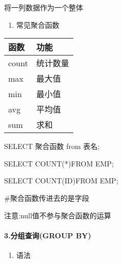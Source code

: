 \documentclass[
  letterpaper,
  DIV=11,
  numbers=noendperiod]{scrreprt}
\let\oldparagraph\paragraph
\renewcommand{\paragraph}[1]{\oldparagraph{#1}\mbox{}}
\newenvironment{Shaded}{\begin{snugshade}}{\end{snugshade}}
\newcommand{\FunctionTok}[1]{\textcolor[rgb]{0.28,0.35,0.67}{#1}}
\newcommand{\KeywordTok}[1]{\textcolor[rgb]{0.00,0.23,0.31}{#1}}
\newcommand{\NormalTok}[1]{\textcolor[rgb]{0.00,0.23,0.31}{#1}}
\newcommand{\OperatorTok}[1]{\textcolor[rgb]{0.37,0.37,0.37}{#1}}
\providecommand{\tightlist}{%
  \setlength{\itemsep}{0pt}\setlength{\parskip}{0pt}}\usepackage{longtable,booktabs,array}
\begin{document}
将一列数据作为一个整体

\begin{enumerate}
\def\labelenumi{\arabic{enumi}.}
\setcounter{enumi}{1}
\tightlist
\item
  常见聚合函数
\end{enumerate}

\begin{longtable}[]{@{}ll@{}}
\toprule\noalign{}
\textbf{函数} & \textbf{功能} \\
\midrule\noalign{}
\endhead
\bottomrule\noalign{}
\endlastfoot
count & 统计数量 \\
max & 最大值 \\
min & 最小值 \\
avg & 平均值 \\
sum & 求和 \\
\end{longtable}

\begin{Shaded}
\begin{Highlighting}[]
\KeywordTok{SELECT}\NormalTok{ 聚合函数 }\KeywordTok{from}\NormalTok{ 表名;}

\KeywordTok{SELECT} \FunctionTok{COUNT}\NormalTok{(}\OperatorTok{*}\NormalTok{)}\KeywordTok{FROM}\NormalTok{ EMP;}

\KeywordTok{SELECT} \FunctionTok{COUNT}\NormalTok{(}\KeywordTok{ID}\NormalTok{)}\KeywordTok{FROM}\NormalTok{ EMP;}

\NormalTok{\#聚合函数传进去的是字段}
\end{Highlighting}
\end{Shaded}

注意:null值不参与聚合函数的运算

\hypertarget{ux5206ux7ec4ux67e5ux8be2group-by}{%
\paragraph{3.分组查询(GROUP
BY)}\label{ux5206ux7ec4ux67e5ux8be2group-by}}

\begin{enumerate}
\def\labelenumi{\arabic{enumi}.}
\tightlist
\item
  语法
\end{enumerate}
\end{document}
